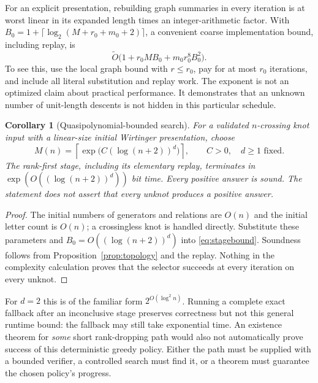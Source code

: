 \documentclass[11pt,letterpaper]{article}
\newtheorem{corollary}[theorem]{Corollary}
\theoremstyle{definition}\newtheorem{definition}[theorem]{Definition}
\begin{document}
For an explicit presentation, rebuilding graph summaries in every iteration is at worst linear in its expanded length times an integer-arithmetic factor. With
$B_0=1+\lceil\log_2(M+r_0+m_0+2)\rceil$, a convenient coarse implementation bound, including replay, is
\begin{equation}\label{eq:stagebound}
 \widetilde O\bigl(1+r_0MB_0+m_0r_0^8B_0^2\bigr).
\end{equation}
To see this, use the local graph bound with $r\le r_0$, pay for at most $r_0$ iterations, and include all literal substitution and replay work. The exponent is not an optimized claim about practical performance. It demonstrates that an unknown number of unit-length descents is not hidden in this particular schedule.

\begin{corollary}[Quasipolynomial-bounded search]\label{cor:qp}
For a validated $n$-crossing knot input with a linear-size initial Wirtinger presentation, choose
\[
 M(n)=\left\lceil\exp\bigl(C(\log(n+2))^d\bigr)\right\rceil,
 \qquad C>0,\quad d\ge1 \text{ fixed}.
\]
The rank-first stage, including its elementary replay, terminates in
$\exp(O((\log(n+2))^d))$ bit time. Every positive answer is sound. The statement does not assert that every unknot produces a positive answer.
\end{corollary}
\begin{proof}
The initial numbers of generators and relations are $O(n)$ and the initial letter count is $O(n)$; a crossingless knot is handled directly. Substitute these parameters and $B_0=O((\log(n+2))^d)$ into \eqref{eq:stagebound}. Soundness follows from Proposition~\ref{prop:topology} and the replay. Nothing in the complexity calculation proves that the selector succeeds at every iteration on every unknot.
\end{proof}

For $d=2$ this is of the familiar form $2^{O(\log^2 n)}$. Running a complete exact fallback after an inconclusive stage preserves correctness but not this general runtime bound: the fallback may still take exponential time. An existence theorem for \emph{some} short rank-dropping path would also not automatically prove success of this deterministic greedy policy. Either the path must be supplied with a bounded verifier, a controlled search must find it, or a theorem must guarantee the chosen policy's progress.
\end{document}
